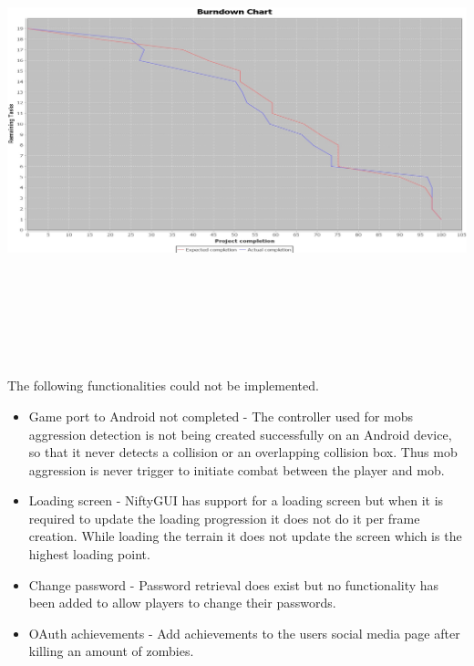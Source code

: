 \documentclass[letterpaper]{article}
\begin{document}
		\begin{minipage}{\textwidth}
			\begin{flushleft}
				\includegraphics[width=\textwidth,height=120mm]{UML_Diagram/Burndown_Chart.jpg}
			\end{flushleft}
		\end{minipage}
				
		\vspace{0.2in}
	\section*{\colorbox{black}{}} 
		\vspace{0.1in}
		
		The following functionalities could not be implemented.
		\begin{itemize}
			\item Game port to Android not completed - The controller used for mobs aggression detection is not being created successfully on an Android device, so that it never detects a collision or an overlapping collision box. Thus mob aggression is never trigger to initiate combat between the player and mob.
			\item Loading screen - NiftyGUI has support for a loading screen but when it is required to update the loading progression it does not do it per frame creation. While loading the terrain it does not update the screen which is the highest loading point.
			\item Change password - Password retrieval does exist but no functionality has been added to allow players to change their passwords.
			\item OAuth achievements - Add achievements to the users social media page after killing an amount of zombies.
		\end{itemize}
		
\end{document}
